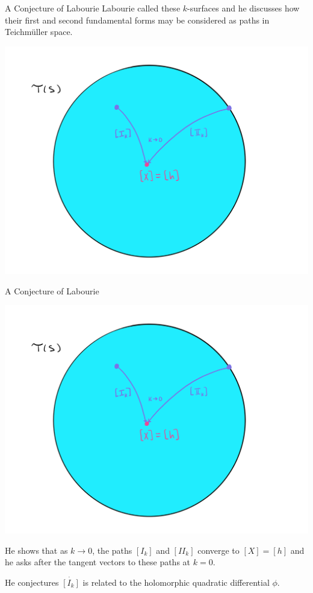 \documentclass[professionalfont]{beamer}
\newcommand{\two}{I\!I}
\begin{document}


\begin{frame}{A Conjecture of Labourie}
Labourie called these $k$-surfaces and he discusses how their first and second fundamental forms may be considered as paths in Teichm\"uller space.

\begin{center}
\includegraphics[scale=0.07]{Teich-paths.jpg}
\end{center}


\end{frame}




\begin{frame}{A Conjecture of Labourie}

\vspace{-0.5cm}
\begin{center}
\includegraphics[scale=0.07]{Teich-paths.jpg}
\end{center}

\vspace{-0.5cm}
He shows that as $k \to 0$, the paths $[I_k]$ and $[\two_k]$ converge to $[X] = [h]$ and he asks after the tangent vectors to these paths at $k=0$. 
\newline

He conjectures $\dot{[I_k]}$ is related to the holomorphic quadratic differential $\phi$.
\end{frame}
\end{document}
